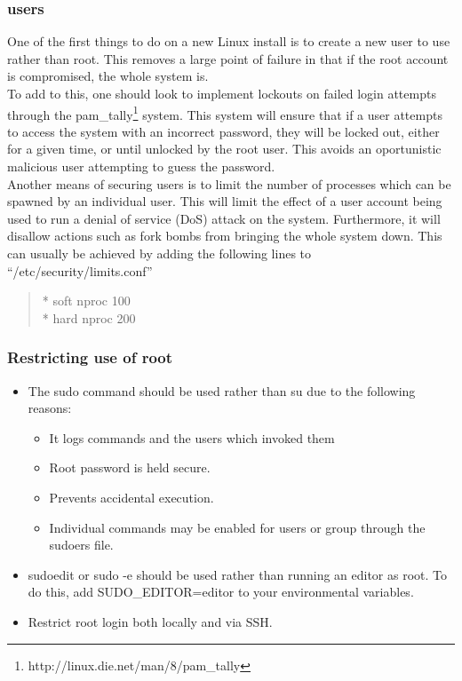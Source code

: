 \documentclass[a4paper,11pt]{book}
\begin{document}
			\subsubsection{users}
				One of the first things to do on a new Linux install is to create a new user to use rather than root. 
				This removes a large point of failure in that if the root account is compromised, the whole system is.\\ 
				To add to this, one should look to implement lockouts on failed login attempts through the pam\_tally\footnote{http://linux.die.net/man/8/pam\_tally} system.
				This system will ensure that if a user attempts to access the system with an incorrect password, they will be locked out, either for a given time, or until unlocked by the root user. 
				This avoids an oportunistic malicious user attempting to guess the password. \\
				Another means of securing users is to limit the number of processes which can be spawned by an individual user. 
				This will limit the effect of a user account being used to run a denial of service (DoS) attack on the system. 
				Furthermore, it will disallow actions such as fork bombs from bringing the whole system down. 
				This can usually be achieved by adding the following lines to ``/etc/security/limits.conf''
				\begin{quote}
					\** soft nproc 100 \\
					\** hard nproc 200 \\
				\end{quote}

			\subsubsection{Restricting use of root}
				\begin{itemize}
					\item The sudo command should be used rather than su due to the following reasons:
						\begin{itemize}
							\item It logs commands and the users which invoked them
							\item Root password is held secure. 
							\item Prevents accidental execution. 
							\item Individual commands may be enabled for users or group through the sudoers file. 
						\end{itemize}
					\item sudoedit or sudo -e should be used rather than running an editor as root. 
						To do this, add SUDO\_EDITOR=editor to your environmental variables.
					\item Restrict root login both locally and via SSH. 
				\end{itemize}
\end{document}
